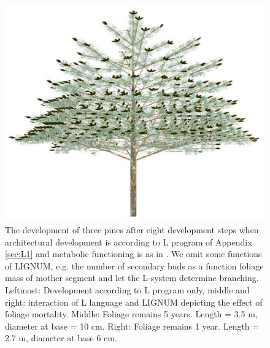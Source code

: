\begin{figure}
\includegraphics[scale=0.20]{pine8F1}   
\caption{The development of three  pines after eight development steps
when architectural  development is according to L  program of Appendix
\ref{sec:L1} and  metabolic functioning is  as in \citet{perttunen:96,
perttunen:98}. We  omit some functions  of LIGNUM, e.g. the  number of
secondary buds  as a function foliage  mass of mother  segment and let
the L-system determine  branching.  Leftmost: Development according to
L program only, middle and right: interaction of L language and LIGNUM
depicting the effect of  foliage mortality.  Middle: Foliage remains 5
years.  Length  = 3.5  m, diameter  at base =  10 cm.   Right: Foliage
remains 1 year.  Length = 2.7 m, diameter at base 6 cm.}
\label{fig:pine}
\end{figure}

